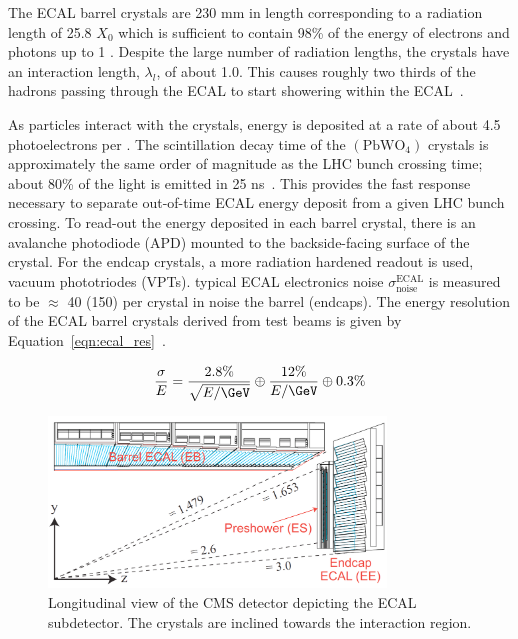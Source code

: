 The ECAL barrel crystals are 230 mm in length corresponding to a
radiation length of 25.8 $X_{0}$ which is sufficient to contain 98\% of the energy
of electrons and photons up to 1 \TeV. Despite the large number of radiation lengths,
the crystals have an interaction length, $\lambda_{l}$, of about 1.0. This causes
roughly two thirds of the hadrons passing through the ECAL to start showering
within the ECAL~\cite{Chatrchyan:2008zzk}. 

As particles interact with the crystals, energy is deposited at a rate of about 4.5
photoelectrons per \MeV.
The scintillation decay time of the $(\textrm{PbWO}_{4})$ crystals is approximately the
same order of magnitude as the LHC bunch crossing time; about 80\% of the light is 
emitted in 25 ns~\cite{dafinei_auffray_lecoq_schneegans_1994}.
This provides the fast response necessary to separate out-of-time ECAL energy deposit
from a given LHC bunch crossing. To read-out the energy deposited in each barrel
crystal, there is an avalanche photodiode (APD) mounted to the backside-facing surface
of the crystal. For the endcap crystals, a more radiation hardened readout is used,
vacuum phototriodes (VPTs). typical ECAL electronics noise 
$\sigma ^{\text{ECAL}} _{\text{noise}}$ is measured to be $\approx$ 40 (150) \MeV 
per crystal in noise the barrel (endcaps).
The energy resolution of the ECAL barrel crystals derived from test beams is given by
Equation~\ref{eqn:ecal_res}~\cite{1748-0221-8-09-P09009}.

\begin{equation}
\label{eqn:ecal_res}
\frac{\sigma}{E} = \frac{2.8\%}{\sqrt{E/\GeV}} \oplus \frac{12\%}{E/\GeV} \oplus 0.3\%
\end{equation}



\begin{figure}[htbp]
\centering
     \includegraphics[width=0.8\textwidth]{cms_and_lhc/plots/cms_ecal.png}
     \caption{
Longitudinal view of the CMS detector depicting the ECAL subdetector.
The crystals are inclined towards the interaction region.
     }
     \label{fig:cms_ecal}
\end{figure}



